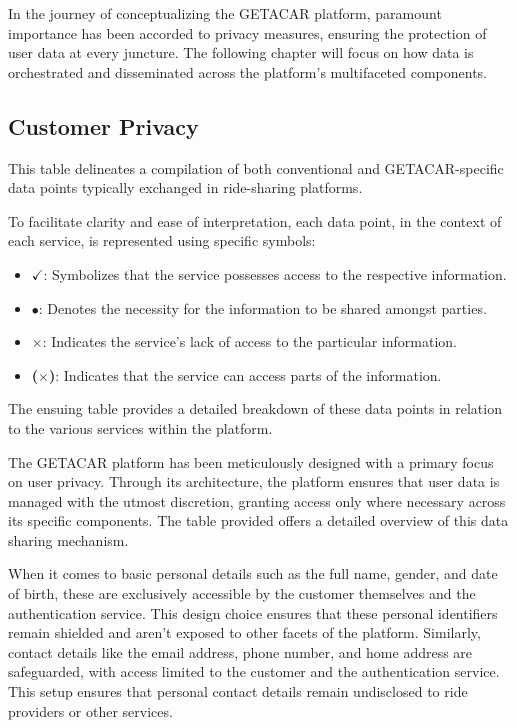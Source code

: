 In the journey of conceptualizing the GETACAR platform, paramount importance has been accorded to privacy measures, ensuring the protection of user data at every juncture. The following chapter will focus on how data is orchestrated and disseminated across the platform's multifaceted components.


\subsection{Customer Privacy}

This table delineates a compilation of both conventional and GETACAR-specific data points typically exchanged in ride-sharing platforms.

To facilitate clarity and ease of interpretation, each data point, in the context of each service, is represented using specific symbols:

\begin{itemize}
    \item \textbf{$\checkmark$}: Symbolizes that the service possesses access to the respective information.
    \item \textbf{$\bullet$}: Denotes the necessity for the information to be shared amongst parties.
    \item \textbf{$\times$}: Indicates the service's lack of access to the particular information.
    \item \textbf{($\times$)}: Indicates that the service can access parts of the information.
\end{itemize}

The ensuing table provides a detailed breakdown of these data points in relation to the various services within the platform.

The GETACAR platform has been meticulously designed with a primary focus on user privacy. Through its architecture, the platform ensures that user data is managed with the utmost discretion, granting access only where necessary across its specific components. The table provided offers a detailed overview of this data sharing mechanism.

When it comes to basic personal details such as the full name, gender, and date of birth, these are exclusively accessible by the customer themselves and the authentication service. This design choice ensures that these personal identifiers remain shielded and aren't exposed to other facets of the platform. Similarly, contact details like the email address, phone number, and home address are safeguarded, with access limited to the customer and the authentication service. This setup ensures that personal contact details remain undisclosed to ride providers or other services.

